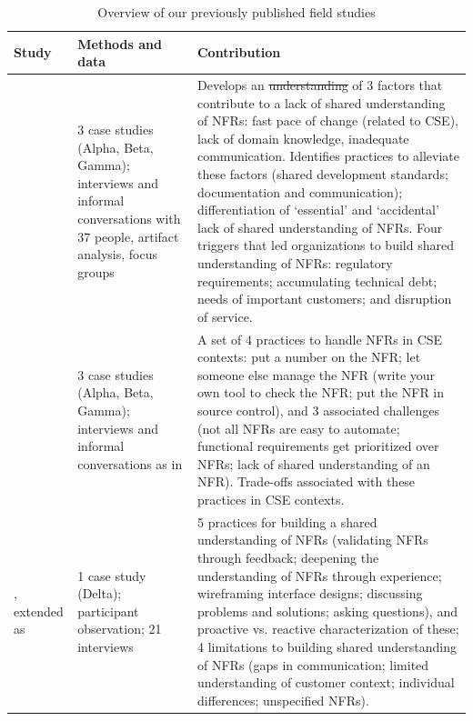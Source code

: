 \documentclass[smallextended]{svjour3}        %
\providecommand{\DIFaddtex}[1]{{\protect\color{blue}\uwave{#1}}} %
\providecommand{\DIFdeltex}[1]{{\protect\color{red}\sout{#1}}} %
\providecommand{\DIFaddFL}[1]{\DIFadd{#1}} %
\providecommand{\DIFdelFL}[1]{\DIFdel{#1}} %
\providecommand{\DIFaddbeginFL}{} %
\providecommand{\DIFaddendFL}{} %
\providecommand{\DIFdelbeginFL}{} %
\providecommand{\DIFdelendFL}{} %
\providecommand{\DIFadd}[1]{\texorpdfstring{\DIFaddtex{#1}}{#1}} %
\providecommand{\DIFdel}[1]{\texorpdfstring{\DIFdeltex{#1}}{}} %
\newcommand{\DIFscaledelfig}{0.5}
\newlength{\DIFdelgraphicswidth} %
\newlength{\DIFdelgraphicsheight} %
\newcommand{\DIFaddincludegraphics}[2][]{{\color{blue}\fbox{\DIFOincludegraphics[#1]{#2}}}} %
\newcommand{\DIFdelincludegraphics}[2][]{%
\sbox{\DIFdelgraphicsbox}{\DIFOincludegraphics[#1]{#2}}%
\settoboxwidth{\DIFdelgraphicswidth}{\DIFdelgraphicsbox} %
\settoboxtotalheight{\DIFdelgraphicsheight}{\DIFdelgraphicsbox} %
\scalebox{\DIFscaledelfig}{%
\parbox[b]{\DIFdelgraphicswidth}{\usebox{\DIFdelgraphicsbox}\\[-\baselineskip] \rule{\DIFdelgraphicswidth}{0em}}\llap{\resizebox{\DIFdelgraphicswidth}{\DIFdelgraphicsheight}{%
\setlength{\unitlength}{\DIFdelgraphicswidth}%
\begin{picture}(1,1)%
\thicklines\linethickness{2pt} %
{\color[rgb]{1,0,0}\put(0,0){\framebox(1,1){}}}%
{\color[rgb]{1,0,0}\put(0,0){\line( 1,1){1}}}%
{\color[rgb]{1,0,0}\put(0,1){\line(1,-1){1}}}%
\end{picture}%
}\hspace*{3pt}}} %
} %
\DeclareRobustCommand{\DIFaddbeginFL}{\DIFOaddbeginFL \let\includegraphics\DIFaddincludegraphics} %
\DeclareRobustCommand{\DIFaddendFL}{\DIFOaddendFL \let\includegraphics\DIFOincludegraphics} %
\DeclareRobustCommand{\DIFdelbeginFL}{\DIFOdelbeginFL \let\includegraphics\DIFdelincludegraphics} %
\DeclareRobustCommand{\DIFdelendFL}{\DIFOaddendFL \let\includegraphics\DIFOincludegraphics} %
\begin{document}
\begin{table}[!t]
    \caption{Overview of our previously published field studies}
    \label{tab:previous}
    \centering
    \DIFdelbeginFL %
\DIFdelendFL \DIFaddbeginFL \begin{tabular}{P{1.9cm}p{3cm}p{6.4cm}}
    \DIFaddendFL \toprule 
    Study & Methods and data & Contribution  \\
    \midrule 
    \cite{werner2020re} & 3 case studies (Alpha, Beta, Gamma); interviews and informal conversations with 37 people, artifact analysis, focus groups & Develops an \DIFdelbeginFL \DIFdelFL{understanding }\DIFdelendFL \DIFaddbeginFL \DIFaddFL{under st anding }\DIFaddendFL of 3 factors that contribute to a lack of shared understanding of NFRs: fast pace of change (related to CSE), lack of domain knowledge, inadequate communication. Identifies practices to alleviate these factors (shared development standards; documentation and communication); differentiation of `essential' and `accidental' lack of shared understanding of NFRs. Four triggers that led organizations to build shared understanding of NFRs: regulatory requirements; accumulating technical debt; needs of important customers; and disruption of service.  \\
    \addlinespace
    \cite{werner_tse_2021} & 3 case studies (Alpha, Beta, Gamma); interviews and informal conversations as in \cite{werner2020re} & A set of 4 practices to handle NFRs in CSE contexts: put a number on the NFR; let someone else manage the NFR (write your own tool to check the NFR; put the NFR in source control), and 3 associated challenges (not all NFRs are easy to automate; functional requirements get prioritized over NFRs; lack of shared understanding of an NFR). Trade-offs associated with these practices in CSE contexts. \\
    \addlinespace
    \cite{okpara_re2022}, extended as \cite{okpara_rej2023} & 1 case study (Delta); participant observation; 21 interviews & 5 practices for building a shared understanding of NFRs (validating NFRs through feedback; deepening the understanding of NFRs through experience; wireframing interface designs; discussing problems and solutions; asking questions), and proactive vs. reactive characterization of these; 4 limitations to building shared understanding of NFRs (gaps in communication; limited understanding of customer context; individual differences; unspecified NFRs). \\    

    \bottomrule 
    \end{tabular}

\end{table}
\end{document}
